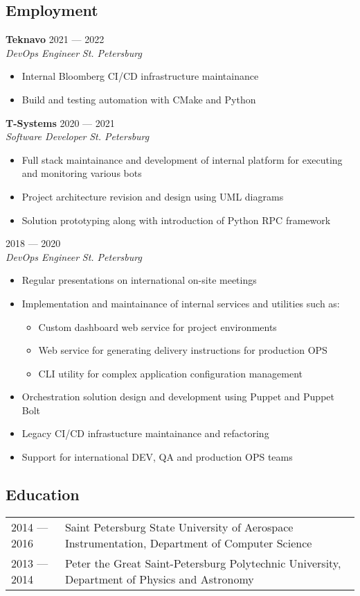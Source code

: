 \documentclass[11pt]{report}
\newenvironment{JobDescription}[4]{
    {\bf #1 } \hfill { #2 }
    \\
    {\em #3 } \hfill {\em #4 }
    \begin{itemize}
} {
    \end{itemize}
}
\begin{document}
\subsection*{Employment}
\begin{JobDescription}{Teknavo}{2021 --- 2022}{DevOps Engineer}{St. Petersburg}
    \item Internal Bloomberg CI/CD infrastructure maintainance
    \item Build and testing automation with CMake and Python
\end{JobDescription}
%
\begin{JobDescription}{T-Systems}{2020 --- 2021}{Software Developer}{St. Petersburg}
    \item Full stack maintainance and development of internal platform for executing and monitoring various bots
    \item Project architecture revision and design using UML diagrams
    \item Solution prototyping along with introduction of Python RPC framework
\end{JobDescription}
%
\begin{JobDescription}{}{2018 --- 2020}{DevOps Engineer}{St. Petersburg}
    \item Regular presentations on international on-site meetings
    \item Implementation and maintainance of internal services and utilities such as:
    \begin{itemize}
        \item Custom dashboard web service for project environments
        \item Web service for generating delivery instructions for production OPS
        \item CLI utility for complex application configuration management
    \end{itemize}
    \item Orchestration solution design and development using Puppet and Puppet Bolt
    \item Legacy CI/CD infrastucture maintainance and refactoring
    \item Support for international DEV, QA and production OPS teams
\end{JobDescription}

\subsection*{Education}
\begin{table}[H]
    \begin{tabular}{@{}p{}p{}}
        2014 --- 2016 & Saint Petersburg State University of Aerospace Instrumentation, Department of Computer Science \\
        2013 --- 2014 & Peter the Great Saint-Petersburg Polytechnic University, Department of Physics and Astronomy
    \end{tabular}
\end{table}
\end{document}
